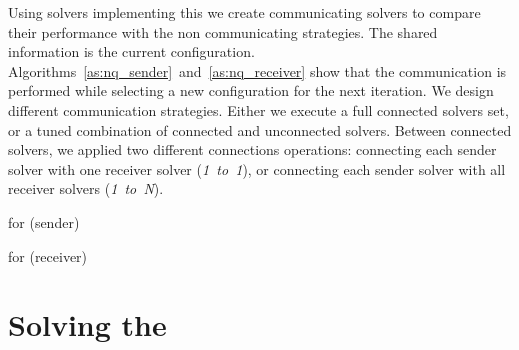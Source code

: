 Using solvers implementing this \as{} we create communicating solvers to compare their performance with the non communicating strategies. The shared information is the current configuration. Algorithms~\ref{as:nq_sender}~and~\ref{as:nq_receiver} show that the communication is performed while selecting a new configuration for the next iteration. We design different communication strategies. Either we execute a full connected solvers set, or a tuned combination of connected and unconnected solvers. Between connected solvers, we applied two different connections operations: connecting each sender solver with one receiver solver ({\it 1~to~1}), or connecting each sender solver with all receiver solvers ({\it 1~to~N}).

\begin{algorithm}[H]
\dontprintsemicolon
\SetNoline
{}
\caption{\As{} for \NQP{} (sender)}\label{as:nq_sender}
\end{algorithm}

\begin{algorithm}[H]
\dontprintsemicolon
\SetNoline
{}
\caption{\As{} for \NQP{} (receiver)}\label{as:nq_receiver}
\end{algorithm}

\section{Solving the \carrp}

